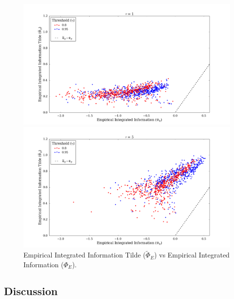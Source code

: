 \documentclass[a4paper,11pt]{article}
\begin{document}
\begin{figure}[H] 
	\begin{minipage}[b]{0.5\linewidth}
		\begin{center}
		\includegraphics[scale = 0.2]{figures/snn/phi_tilde_vs_phi_1}
		\end{center}
		\vspace{4ex}
	\end{minipage}
	\begin{minipage}[b]{0.5\linewidth}
		\begin{center}
		\includegraphics[scale = 0.2]{figures/snn/phi_tilde_vs_phi_5}
		\end{center}
		\vspace{4ex}
	\end{minipage}
	\caption{
		Empirical Integrated Information Tilde ($\widetilde{\Phi}_E$) vs Empirical Integrated Information ($\Phi_E$).
		\label{fig:phi_tilde_vs_phi}
	}
\end{figure}

\subsection{Discussion}
\label{sec:snn:disc}
\end{document}
